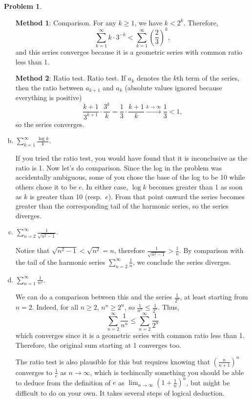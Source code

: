 \documentclass[11pt,oneside]{amsart}
\theoremstyle{definition}
\newtheorem{problem}{Problem}
\theoremstyle{plain}
\begin{document}
\begin{problem}
\begin{enumerate}[(a)]
\begin{solution}
          \textbf{Method 1}: Comparison. For any $k\geq 1$, we have $k<2^k$. Therefore,
          \[\sum_{k=1}^\infty k\cdot 3^{-k}<\sum_{k=1}^\infty \left(\frac 23\right)^k,\]
          and this series converges because it is a geometric series with common ratio less than 1.
        \end{solution}
        \begin{solution}
          \textbf{Method 2}: Ratio test. Ratio test. If $a_k$ denotes the $k$th term of the series, then the ratio between $a_{k+1}$ and $a_k$ (absolute values ignored because everything is positive)
          \[\frac{k+1}{3^{k+1}}\cdot \frac{3^k}k=\frac 13\cdot\frac{k+1}k\xrightarrow{k\to\infty}\frac 13<1,\]
          so the series converges.
        \end{solution}
  \item $\displaystyle\sum_{k=1}^\infty\frac{\log k}k$.
        \begin{solution}
          If you tried the ratio test, you would have found that it is inconclusive as the ratio is 1. Now let's do comparison. Since the log in the problem was accidentally ambiguous, some of you chose the base of the log to be 10 while others chose it to be $e$. In either case, $\log k$ becomes greater than 1 as soon as $k$ is greater than 10 (resp.\ $e$). From that point onward the series becomes greater than the corresponding tail of the harmonic series, so the series diverges.
        \end{solution}
  \item $\displaystyle\sum_{n=2}^\infty\frac 1{\sqrt{n^2-1}}$.
        \begin{solution}
          Notice that $\sqrt{n^2-1}<\sqrt{n^2}=n$, therefore $\frac 1{\sqrt{n^2-1}}>\frac 1n$. By comparison with the tail of the harmonic series $\sum_{n=2}^\infty \frac 1n$, we conclude the series diverges.
        \end{solution}
  \item $\displaystyle\sum_{n=1}^\infty\frac 1{n^n}$.
        \begin{solution}
          We can do a comparison between this and the series $\frac 1{2^n}$, at least starting from $n=2$. Indeed, for all $n\geq 2$, $n^n\geq 2^n$, so $\frac 1{n^n}\leq\frac 1{2^n}$. Thus,
          \[\sum_{n=2}^\infty\frac 1{n^n}\leq\sum_{n=2}^\infty \frac 1{2^n}\]
          which converges since it is a geometric series with common ratio less than 1. Therefore, the original sum starting at 1 converges too.

          The ratio test is also plausible for this but requires knowing that $\left( \frac n{n+1} \right)^n$ converges to $\frac 1e$ as $n\to\infty$, which is techincally something you should be able to deduce from the definition of $e$ as $\lim_{n\to\infty}\left( 1+\frac 1n \right)^n$, but might be difficult to do on your own. It takes several steps of logical deduction.
        \end{solution}
\end{enumerate}
\end{problem}
\end{document}

